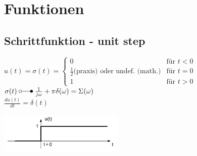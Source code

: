 

\section{Funktionen}
	\subsection{Schrittfunktion - unit step}
		\begin{minipage}{10cm}
			$u(t) = \sigma(t) =	\begin{cases}
						 0 & \text{f\"ur } t < 0 \\
						 \frac{1}{2} \text{(praxis)}  \text{ oder undef. (math.)} & \text{f\"ur } t = 0 \\
						 1 & \text{f\"ur } t > 0
					\end{cases}
			$
			$\sigma(t) \; \laplace \; \frac{1}{j\omega} + \pi\delta(\omega) = \Sigma(\omega)$ \\
			$\frac{du(t)}{dt}=\delta(t)$
		\end{minipage}
		\begin{minipage}{8cm}
			\includegraphics[width=6cm]{./bilder/unitstep.png}
		\end{minipage}


